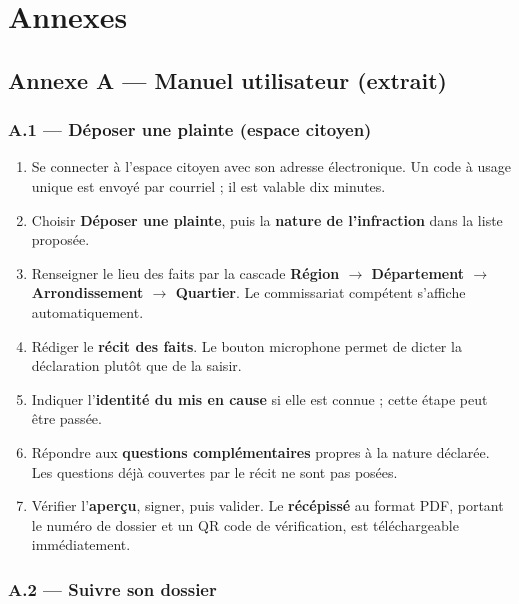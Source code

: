 
\chapter{Annexes}
\label{ch:annexes}

\section*{Annexe A — Manuel utilisateur (extrait)}

\subsection*{A.1 — Déposer une plainte (espace citoyen)}

\begin{enumerate}
    \item Se connecter à l'espace citoyen avec son adresse électronique. Un code à usage unique est envoyé par courriel ; il est valable dix minutes.
    \item Choisir \textbf{Déposer une plainte}, puis la \textbf{nature de l'infraction} dans la liste proposée.
    \item Renseigner le lieu des faits par la cascade \textbf{Région $\rightarrow$ Département $\rightarrow$ Arrondissement $\rightarrow$ Quartier}. Le commissariat compétent s'affiche automatiquement.
    \item Rédiger le \textbf{récit des faits}. Le bouton microphone permet de dicter la déclaration plutôt que de la saisir.
    \item Indiquer l'\textbf{identité du mis en cause} si elle est connue ; cette étape peut être passée.
    \item Répondre aux \textbf{questions complémentaires} propres à la nature déclarée. Les questions déjà couvertes par le récit ne sont pas posées.
    \item Vérifier l'\textbf{aperçu}, signer, puis valider. Le \textbf{récépissé} au format PDF, portant le numéro de dossier et un QR code de vérification, est téléchargeable immédiatement.
\end{enumerate}



\subsection*{A.2 — Suivre son dossier}

